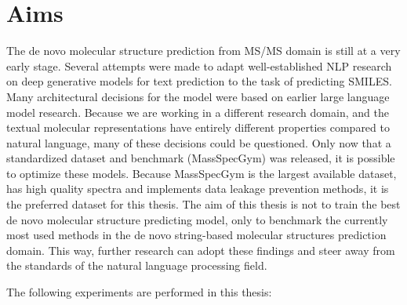 \chapter{Aims}
\label{chap:aims}

The de novo molecular structure prediction from \ac{MS/MS} domain is still at a very early stage.
Several attempts were made to adapt well-established \ac{NLP} research on deep generative models for text prediction to the task of predicting SMILES.
Many architectural decisions for the model were based on earlier large language model research.
Because we are working in a different research domain, and the textual molecular representations have entirely different properties compared to natural language,
many of these decisions could be questioned.
Only now that a standardized dataset and benchmark (MassSpecGym) was released, it is possible to optimize these models.
Because MassSpecGym is the largest available dataset, has high quality spectra and implements data leakage prevention methods, it is the preferred dataset for this thesis.
The aim of this thesis is not to train the best de novo molecular structure predicting model,
only to benchmark the currently most used methods in the de novo string-based molecular structures prediction domain.
This way, further research can adopt these findings and steer away from the standards of the natural language processing field.

The following experiments are performed in this thesis:

